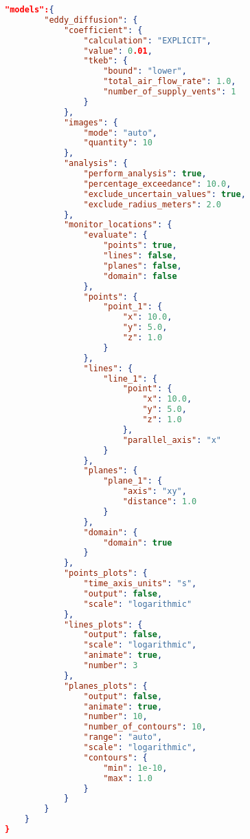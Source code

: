 \begin{lstlisting}[language=json,firstnumber=1]
    "models":{
        "eddy_diffusion": {
            "coefficient": {
                "calculation": "EXPLICIT",
                "value": 0.01,
                "tkeb": {
                    "bound": "lower",
                    "total_air_flow_rate": 1.0,
                    "number_of_supply_vents": 1
                }
            },
            "images": {
                "mode": "auto",
                "quantity": 10
            },
            "analysis": {
                "perform_analysis": true,
                "percentage_exceedance": 10.0,
                "exclude_uncertain_values": true,
                "exclude_radius_meters": 2.0
            },
            "monitor_locations": {
                "evaluate": {
                    "points": true,
                    "lines": false,
                    "planes": false,
                    "domain": false
                },
                "points": {
                    "point_1": {
                        "x": 10.0,
                        "y": 5.0,
                        "z": 1.0
                    }
                },
                "lines": {
                    "line_1": {
                        "point": {
                            "x": 10.0,
                            "y": 5.0,
                            "z": 1.0 
                        },
                        "parallel_axis": "x"
                    }
                },
                "planes": {
                    "plane_1": {
                        "axis": "xy",
                        "distance": 1.0
                    }
                },
                "domain": {
                    "domain": true 
                }
            },
            "points_plots": {
                "time_axis_units": "s",
                "output": false,
                "scale": "logarithmic"
            },
            "lines_plots": {
                "output": false,
                "scale": "logarithmic",
                "animate": true,
                "number": 3 
            },
            "planes_plots": {
                "output": false,
                "animate": true,
                "number": 10,
                "number_of_contours": 10,
                "range": "auto",
                "scale": "logarithmic",
                "contours": {
                    "min": 1e-10,
                    "max": 1.0
                }
            }
        }
    }
}
\end{lstlisting}

